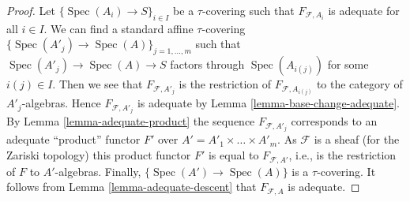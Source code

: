 \documentclass{stacks-project}
\theoremstyle{plain}
\theoremstyle{definition}
\theoremstyle{remark}
\numberwithin{equation}{subsection}
\def\Spec{\mathop{\mathrm{Spec}}}
\begin{document}
\begin{proof}
Let $\{\Spec(A_i) \to S\}_{i \in I}$ be a $\tau$-covering
such that $F_{\mathcal{F}, A_i}$ is adequate for all $i \in I$.
We can find a standard affine $\tau$-covering
$\{\Spec(A'_j) \to \Spec(A)\}_{j = 1, \ldots, m}$
such that $\Spec(A'_j) \to \Spec(A) \to S$ factors
through $\Spec(A_{i(j)})$ for some $i(j) \in I$. Then we see that
$F_{\mathcal{F}, A'_j}$ is the restriction of
$F_{\mathcal{F}, A_{i(j)}}$ to the category of $A'_j$-algebras.
Hence $F_{\mathcal{F}, A'_j}$ is adequate by
Lemma \ref{lemma-base-change-adequate}.
By
Lemma \ref{lemma-adequate-product}
the sequence
$F_{\mathcal{F}, A'_j}$ corresponds to an adequate ``product'' functor
$F'$ over $A' = A'_1 \times \ldots \times A'_m$. As $\mathcal{F}$ is a
sheaf (for the Zariski topology) this product functor $F'$ is equal
to $F_{\mathcal{F}, A'}$, i.e., is the restriction of $F$ to $A'$-algebras.
Finally,  $\{\Spec(A') \to \Spec(A)\}$ is a $\tau$-covering.
It follows from
Lemma \ref{lemma-adequate-descent}
that $F_{\mathcal{F}, A}$ is adequate.
\end{proof}
\end{document}
